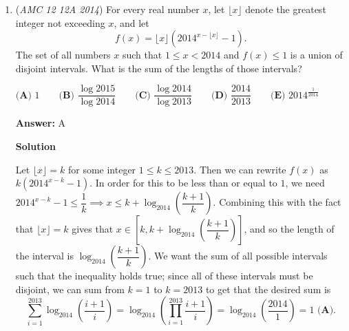 \begin{enumerate}
 (Diagram by shihan)Reflect $C$ across $AB$ to $C'$. Similarly, reflect $B$ across $AC$ to $B'$. Clearly, $BE = B'E$ and $CD = C'D$. Thus, the sum $BE + DE + CD = B'E + DE + C'D$. This value is minimized when $B'$, $C'$, $D$ and $E$ are collinear. To finish, we use the law of cosines on the triangle $AB'C'$: $B'C' = \sqrt{6^2 + 10^2 - 2(6)(10)\cos 120^{\circ}} = \boxed{\textbf{(D) } 14}.$

 


 Note (note by JiYang): $\quad \because \angle BAC \textless \frac{\pi}{3}$ $\qquad \therefore \angle C'AB' \textless \pi$ $\qquad \therefore$ the line C'B' would pass through $\Delta ABC$

 \textbf{Remark} This problem is similar to \href{https://en.wikipedia.org/wiki/Fagnano\%27s\_problem}{Fagnano's Problem}.

 


	\item (\textit{AMC 12 12A 2014}) For every real number $x$, let $\lfloor x\rfloor$ denote the greatest integer not exceeding $x$, and let 
 \[f(x)=\lfloor x\rfloor(2014^{x-\lfloor x\rfloor}-1).\]  The set of all numbers $x$ such that $1\leq x<2014$ and $f(x)\leq 1$ is a union of disjoint intervals.  What is the sum of the lengths of those intervals?


 $\textbf{(A) }1\qquad \textbf{(B) }\dfrac{\log 2015}{\log 2014}\qquad \textbf{(C) }\dfrac{\log 2014}{\log 2013}\qquad \textbf{(D) }\dfrac{2014}{2013}\qquad \textbf{(E) }2014^{\frac1{2014}}\qquad$

 \textbf{Answer: }A



\textbf{Solution}

Let $\lfloor x\rfloor=k$ for some integer $1\leq k\leq 2013$.  Then we can rewrite $f(x)$ as $k(2014^{x-k}-1)$.  In order for this to be less than or equal to $1$, we need $2014^{x-k}-1\leq\dfrac1k\implies x\leq k+\log_{2014}\left(\dfrac{k+1}k\right)$.  Combining this with the fact that $\lfloor x\rfloor =k$ gives that $x\in\left[k,k+\log_{2014}\left(\dfrac{k+1}k\right)\right]$, and so the length of the interval is $\log_{2014}\left(\dfrac{k+1}k\right)$.  We want the sum of all possible intervals such that the inequality holds true; since all of these intervals must be disjoint, we can sum from $k=1$ to $k=2013$ to get that the desired sum is 
 \[\sum_{i=1}^{2013}\log_{2014}\left(\dfrac{i+1}i\right)=\log_{2014}\left(\prod_{i=1}^{2013}\dfrac{i+1}i\right)=\log_{2014}\left(\dfrac{2014}1\right)=\boxed{1\textbf{ (A)}}.\]


\end{enumerate}
